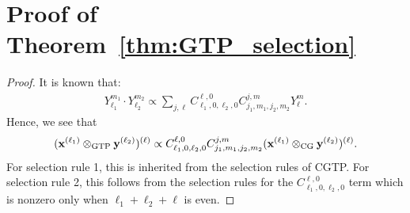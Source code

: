 \section{Proof of Theorem~\ref{thm:GTP_selection}}
\label{sec:proofs}
\begin{proof}
    It is known \citep{gaunt1929iv} that:
    \begin{align*}
        Y^{m_1}_{\ell_1}\cdot Y^{m_2}_{\ell_2} \propto \sum_{j,\ell}C^{\ell,0}_{\ell_1,0,\ell_2,0}C^{j,m}_{j_1,m_1,j_2,m_2}Y^m_{\ell}.
    \end{align*}
    Hence, we see that
    \begin{align*}
        (\mathbf{x}^{(\ell_{1})}\otimes_{\mathrm{GTP}}\mathbf{y}^{(\ell_{2})})^{(\ell)}\propto C^{\ell,0}_{\ell_1,0,\ell_2,0}C^{j,m}_{j_1,m_1,j_2,m_2}(\mathbf{x}^{(\ell_{1})}\otimes_{\mathrm{CG}}\mathbf{y}^{(\ell_{2})})^{(\ell)}.
    \end{align*}
    For selection rule 1, this is inherited from the selection rules of CGTP. For selection rule 2, this follows from the selection rules for the $C^{\ell,0}_{\ell_1,0,\ell_2,0}$ term which is nonzero only when $\ell_1+\ell_2+\ell$ is even.
\end{proof}